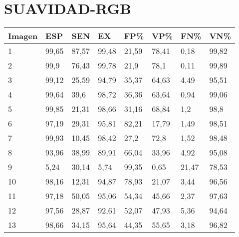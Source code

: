 \section{SUAVIDAD-RGB}
\begin{longtable}[c]{|l|l|l|l|l|l|l|l|}
\hline
\textbf{Imagen} & \textbf{ESP} & \textbf{SEN} & \textbf{EX} & \textbf{FP\%} & \textbf{VP\%} & \textbf{FN\%} & \textbf{VN\%} \\ \hline
\endfirsthead
%
\endhead
%
1               & 99,65        & 87,57        & 99,48       & 21,59         & 78,41         & 0,18          & 99,82         \\ \hline
2               & 99,9         & 76,43        & 99,78       & 21,9          & 78,1          & 0,11          & 99,89         \\ \hline
3               & 99,12        & 25,59        & 94,79       & 35,37         & 64,63         & 4,49          & 95,51         \\ \hline
4               & 99,64        & 39,6         & 98,72       & 36,36         & 63,64         & 0,94          & 99,06         \\ \hline
5               & 99,85        & 21,31        & 98,66       & 31,16         & 68,84         & 1,2           & 98,8          \\ \hline
6               & 97,19        & 29,31        & 95,81       & 82,21         & 17,79         & 1,49          & 98,51         \\ \hline
7               & 99,93        & 10,45        & 98,42       & 27,2          & 72,8          & 1,52          & 98,48         \\ \hline
8               & 93,96        & 38,99        & 89,91       & 66,04         & 33,96         & 4,92          & 95,08         \\ \hline
9               & 5,24         & 30,14        & 5,74        & 99,35         & 0,65          & 21,47         & 78,53         \\ \hline
10              & 98,16        & 12,31        & 94,87       & 78,93         & 21,07         & 3,44          & 96,56         \\ \hline
11              & 97,18        & 50,05        & 95,06       & 54,34         & 45,66         & 2,37          & 97,63         \\ \hline
12              & 97,56        & 28,87        & 92,61       & 52,07         & 47,93         & 5,36          & 94,64         \\ \hline
13              & 98,66        & 34,15        & 95,64       & 44,35         & 55,65         & 3,18          & 96,82         \\ \hline

\end{longtable}
